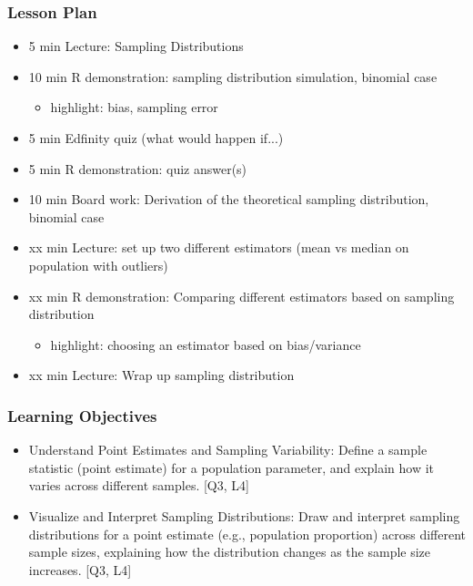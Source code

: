 

\begin{frame}
\frametitle{Lesson Plan}
\begin{itemize}
    \item 5 min Lecture: Sampling Distributions
    \item 10 min R demonstration: sampling distribution simulation, binomial case
    \begin{itemize}
        \item  highlight: bias, sampling error
    \end{itemize}
    \item 5 min Edfinity quiz (what would happen if...)
    \item 5 min R demonstration: quiz answer(s)
    \item 10 min Board work: Derivation of the theoretical sampling distribution, binomial case
    \item xx min Lecture: set up two different estimators (mean vs median on population with outliers) 
    \item xx min R demonstration: Comparing different estimators based on sampling distribution 
    \begin{itemize}
        \item  highlight: choosing an estimator based on bias/variance
    \end{itemize}
    \item xx min Lecture: Wrap up sampling distribution
\end{itemize}
\end{frame}

\begin{frame}
\frametitle{Learning Objectives}
\begin{itemize}
    \item Understand Point Estimates and Sampling Variability: Define a sample statistic (point estimate) for a population parameter, and explain how it varies across different samples. [Q3, L4] 
    \item Visualize and Interpret Sampling Distributions: Draw and interpret sampling distributions for a point estimate (e.g., population proportion) across different sample sizes, explaining how the distribution changes as the sample size increases. [Q3, L4] 
\end{itemize}
\end{frame}


